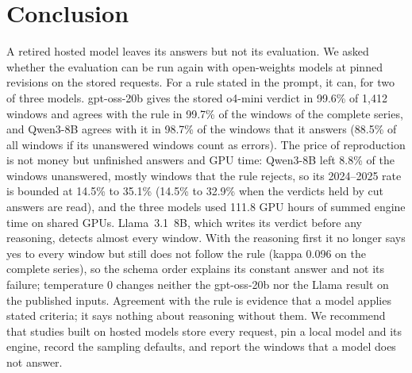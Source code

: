 \section{Conclusion}
\label{sec:conclusion}

A retired hosted model leaves its answers but not its evaluation. We asked whether the evaluation can be run again with open-weights models at pinned revisions on the stored requests. For a rule stated in the prompt, it can, for two of three models. gpt-oss-20b gives the stored o4-mini verdict in 99.6\% of 1{,}412 windows and agrees with the rule in 99.7\% of the windows of the complete series, and Qwen3-8B agrees with it in 98.7\% of the windows that it answers (88.5\% of all windows if its unanswered windows count as errors). The price of reproduction is not money but unfinished answers and GPU time: Qwen3-8B left 8.8\% of the windows unanswered, mostly windows that the rule rejects, so its 2024--2025 rate is bounded at 14.5\% to 35.1\% (14.5\% to 32.9\% when the verdicts held by cut answers are read), and the three models used 111.8 GPU hours of summed engine time on shared GPUs. Llama~3.1~8B, which writes its verdict before any reasoning, detects almost every window. With the reasoning first it no longer says yes to every window but still does not follow the rule (kappa 0.096 on the complete series), so the schema order explains its constant answer and not its failure; temperature 0 changes neither the gpt-oss-20b nor the Llama result on the published inputs. Agreement with the rule is evidence that a model applies stated criteria; it says nothing about reasoning without them. We recommend that studies built on hosted models store every request, pin a local model and its engine, record the sampling defaults, and report the windows that a model does not answer.
